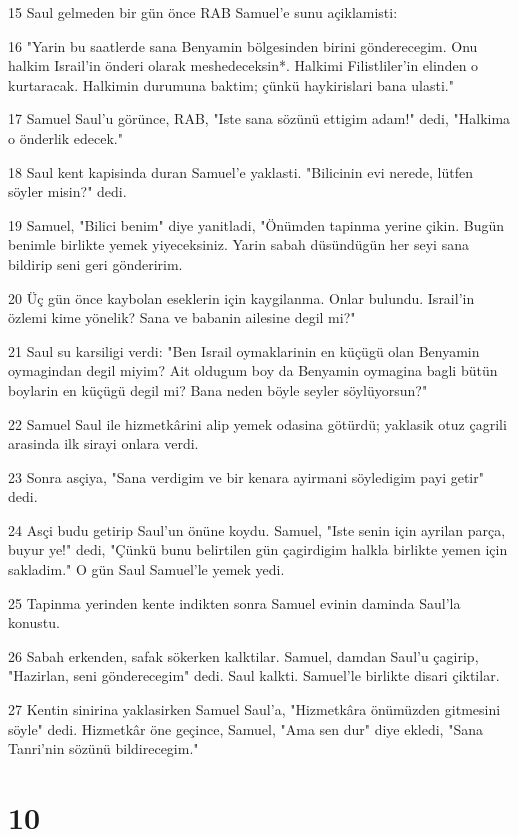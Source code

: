 \par 15 Saul gelmeden bir gün önce RAB Samuel'e sunu açiklamisti:
\par 16 "Yarin bu saatlerde sana Benyamin bölgesinden birini gönderecegim. Onu halkim Israil'in önderi olarak meshedeceksin*. Halkimi Filistliler'in elinden o kurtaracak. Halkimin durumuna baktim; çünkü haykirislari bana ulasti."
\par 17 Samuel Saul'u görünce, RAB, "Iste sana sözünü ettigim adam!" dedi, "Halkima o önderlik edecek."
\par 18 Saul kent kapisinda duran Samuel'e yaklasti. "Bilicinin evi nerede, lütfen söyler misin?" dedi.
\par 19 Samuel, "Bilici benim" diye yanitladi, "Önümden tapinma yerine çikin. Bugün benimle birlikte yemek yiyeceksiniz. Yarin sabah düsündügün her seyi sana bildirip seni geri gönderirim.
\par 20 Üç gün önce kaybolan eseklerin için kaygilanma. Onlar bulundu. Israil'in özlemi kime yönelik? Sana ve babanin ailesine degil mi?"
\par 21 Saul su karsiligi verdi: "Ben Israil oymaklarinin en küçügü olan Benyamin oymagindan degil miyim? Ait oldugum boy da Benyamin oymagina bagli bütün boylarin en küçügü degil mi? Bana neden böyle seyler söylüyorsun?"
\par 22 Samuel Saul ile hizmetkârini alip yemek odasina götürdü; yaklasik otuz çagrili arasinda ilk sirayi onlara verdi.
\par 23 Sonra asçiya, "Sana verdigim ve bir kenara ayirmani söyledigim payi getir" dedi.
\par 24 Asçi budu getirip Saul'un önüne koydu. Samuel, "Iste senin için ayrilan parça, buyur ye!" dedi, "Çünkü bunu belirtilen gün çagirdigim halkla birlikte yemen için sakladim." O gün Saul Samuel'le yemek yedi.
\par 25 Tapinma yerinden kente indikten sonra Samuel evinin daminda Saul'la konustu.
\par 26 Sabah erkenden, safak sökerken kalktilar. Samuel, damdan Saul'u çagirip, "Hazirlan, seni gönderecegim" dedi. Saul kalkti. Samuel'le birlikte disari çiktilar.
\par 27 Kentin sinirina yaklasirken Samuel Saul'a, "Hizmetkâra önümüzden gitmesini söyle" dedi. Hizmetkâr öne geçince, Samuel, "Ama sen dur" diye ekledi, "Sana Tanri'nin sözünü bildirecegim."

\chapter{10}

